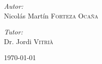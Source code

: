 \begin{titlepage}
\begin{multicols}{2}
\begin{flushleft}
\emph{Autor:}\\
Nicolás Martín \textsc{Forteza Ocaña}\\[3cm] %
\vfill
\columnbreak
\end{flushleft}

\begin{flushright}
\emph{Tutor:}\\
Dr. Jordi \textsc{Vitrià}\\[3cm] %
\vfill
\end{flushright}

\end{multicols}
\vspace{3cm}




{\large \today}\\[3cm] %


 

\vfill %

\end{titlepage}

